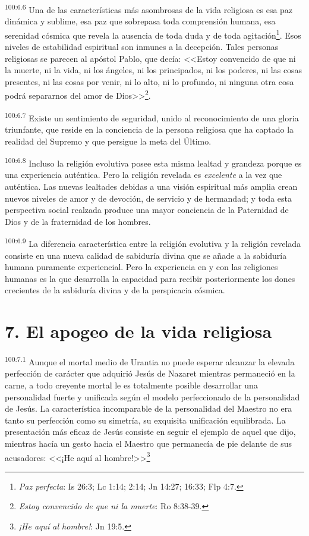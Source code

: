 \documentclass[twoside, 11pt]{book}
\begin{document}
\par
\textsuperscript{100:6.6} Una de las características más asombrosas de la vida religiosa es esa paz dinámica y sublime, esa paz que sobrepasa toda comprensión humana, esa serenidad cósmica que revela la ausencia de toda duda y de toda agitación\footnote{\textit{Paz perfecta}: Is 26:3; Lc 1:14; 2:14; Jn 14:27; 16:33; Flp 4:7.}. Esos niveles de estabilidad espiritual son inmunes a la decepción. Tales personas religiosas se parecen al apóstol Pablo, que decía: <<Estoy convencido de que ni la muerte, ni la vida, ni los ángeles, ni los principados, ni los poderes, ni las cosas presentes, ni las cosas por venir, ni lo alto, ni lo profundo, ni ninguna otra cosa podrá separarnos del amor de Dios>>\footnote{\textit{Estoy convencido de que ni la muerte}: Ro 8:38-39.}.

\par
\textsuperscript{100:6.7} Existe un sentimiento de seguridad, unido al reconocimiento de una gloria triunfante, que reside en la conciencia de la persona religiosa que ha captado la realidad del Supremo y que persigue la meta del Último.

\par
\textsuperscript{100:6.8} Incluso la religión evolutiva posee esta misma lealtad y grandeza porque es una experiencia auténtica. Pero la religión revelada es \textit{excelente} a la vez que auténtica. Las nuevas lealtades debidas a una visión espiritual más amplia crean nuevos niveles de amor y de devoción, de servicio y de hermandad; y toda esta perspectiva social realzada produce una mayor conciencia de la Paternidad de Dios y de la fraternidad de los hombres.

\par
\textsuperscript{100:6.9} La diferencia característica entre la religión evolutiva y la religión revelada consiste en una nueva calidad de sabiduría divina que se añade a la sabiduría humana puramente experiencial. Pero la experiencia en y con las religiones humanas es la que desarrolla la capacidad para recibir posteriormente los dones crecientes de la sabiduría divina y de la perspicacia cósmica.

\section*{7. El apogeo de la vida religiosa}
\par
\textsuperscript{100:7.1} Aunque el mortal medio de Urantia no puede esperar alcanzar la elevada perfección de carácter que adquirió Jesús de Nazaret mientras permaneció en la carne, a todo creyente mortal le es totalmente posible desarrollar una personalidad fuerte y unificada según el modelo perfeccionado de la personalidad de Jesús. La característica incomparable de la personalidad del Maestro no era tanto su perfección como su simetría, su exquisita unificación equilibrada. La presentación más eficaz de Jesús consiste en seguir el ejemplo de aquel que dijo, mientras hacía un gesto hacia el Maestro que permanecía de pie delante de sus acusadores: <<¡He aquí al hombre!>>\footnote{\textit{¡He aquí al hombre!}: Jn 19:5.}
\end{document}
